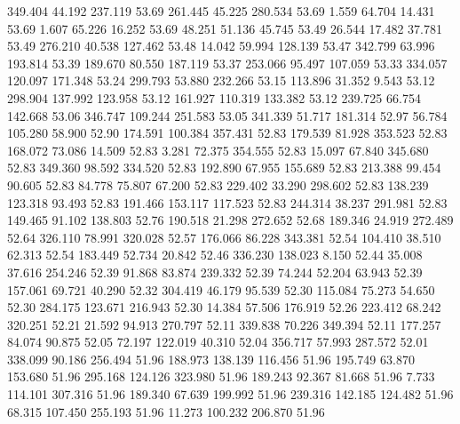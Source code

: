  349.404   44.192  237.119        53.69
 261.445   45.225  280.534        53.69
   1.559   64.704   14.431        53.69
   1.607   65.226   16.252        53.69
  48.251   51.136   45.745        53.49
  26.544   17.482   37.781        53.49
 276.210   40.538  127.462        53.48
  14.042   59.994  128.139        53.47
 342.799   63.996  193.814        53.39
 189.670   80.550  187.119        53.37
 253.066   95.497  107.059        53.33
 334.057  120.097  171.348        53.24
 299.793   53.880  232.266        53.15
 113.896   31.352    9.543        53.12
 298.904  137.992  123.958        53.12
 161.927  110.319  133.382        53.12
 239.725   66.754  142.668        53.06
 346.747  109.244  251.583        53.05
 341.339   51.717  181.314        52.97
  56.784  105.280   58.900        52.90
 174.591  100.384  357.431        52.83
 179.539   81.928  353.523        52.83
 168.072   73.086   14.509        52.83
   3.281   72.375  354.555        52.83
  15.097   67.840  345.680        52.83
 349.360   98.592  334.520        52.83
 192.890   67.955  155.689        52.83
 213.388   99.454   90.605        52.83
  84.778   75.807   67.200        52.83
 229.402   33.290  298.602        52.83
 138.239  123.318   93.493        52.83
 191.466  153.117  117.523        52.83
 244.314   38.237  291.981        52.83
 149.465   91.102  138.803        52.76
 190.518   21.298  272.652        52.68
 189.346   24.919  272.489        52.64
 326.110   78.991  320.028        52.57
 176.066   86.228  343.381        52.54
 104.410   38.510   62.313        52.54
 183.449   52.734   20.842        52.46
 336.230  138.023    8.150        52.44
  35.008   37.616  254.246        52.39
  91.868   83.874  239.332        52.39
  74.244   52.204   63.943        52.39
 157.061   69.721   40.290        52.32
 304.419   46.179   95.539        52.30
 115.084   75.273   54.650        52.30
 284.175  123.671  216.943        52.30
  14.384   57.506  176.919        52.26
 223.412   68.242  320.251        52.21
  21.592   94.913  270.797        52.11
 339.838   70.226  349.394        52.11
 177.257   84.074   90.875        52.05
  72.197  122.019   40.310        52.04
 356.717   57.993  287.572        52.01
 338.099   90.186  256.494        51.96
 188.973  138.139  116.456        51.96
 195.749   63.870  153.680        51.96
 295.168  124.126  323.980        51.96
 189.243   92.367   81.668        51.96
   7.733  114.101  307.316        51.96
 189.340   67.639  199.992        51.96
 239.316  142.185  124.482        51.96
  68.315  107.450  255.193        51.96
  11.273  100.232  206.870        51.96
